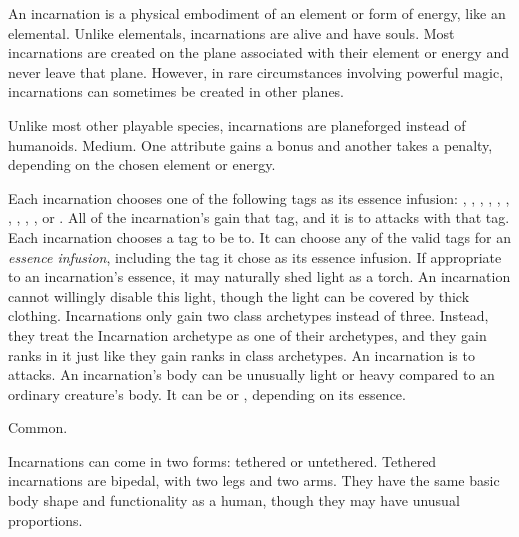   An incarnation is a physical embodiment of an element or form of energy, like an elemental.
  Unlike elementals, incarnations are alive and have souls.
  Most incarnations are created on the plane associated with their element or energy and never leave that plane.
  However, in rare circumstances involving powerful magic, incarnations can sometimes be created in other planes.

   Unlike most other playable species, incarnations are planeforged instead of humanoids.
   Medium.
   One attribute gains a  bonus and another takes a  penalty, depending on the chosen element or energy.
  \begin{raggeditemize}
     Each incarnation chooses one of the following tags as its essence infusion: \atAcid, \atAir, \atAuditory, \atCold, \atCompulsion, \atEarth, \atEmotion, \atElectricity, \atFire, \atVisual, or \atWater.
      All of the incarnation's  gain that tag, and it is \impervious to attacks with that tag.
     Each incarnation chooses a tag to be \vulnerable to.
      It can choose any of the valid tags for an \textit{essence infusion}, including the tag it chose as its essence infusion.
     If appropriate to an incarnation's essence, it may naturally shed light as a torch.
      An incarnation cannot willingly disable this light, though the light can be covered by thick clothing.
     Incarnations only gain two class archetypes instead of three.
      Instead, they treat the Incarnation archetype as one of their archetypes, and they gain ranks in it just like they gain ranks in class archetypes.
     An incarnation is \impervious to \atPoison attacks.
     An incarnation's body can be unusually light or heavy compared to an ordinary creature's body.
      It can be  or , depending on its essence.
  \end{raggeditemize}
   Common.

  Incarnations can come in two forms: tethered or untethered.
  Tethered incarnations are bipedal, with two legs and two arms.
  They have the same basic body shape and functionality as a human, though they may have unusual proportions.

